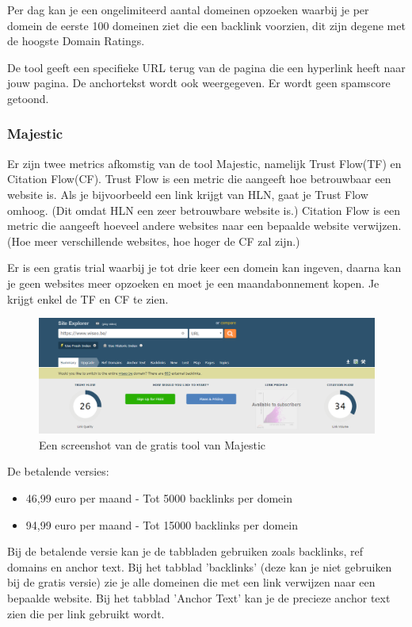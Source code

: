 Per dag kan je een ongelimiteerd aantal domeinen opzoeken waarbij je per domein de eerste 100 domeinen ziet die een backlink voorzien, dit zijn degene met de hoogste Domain Ratings.

De tool geeft een specifieke URL terug van de pagina die een hyperlink heeft naar jouw pagina. De anchortekst wordt ook weergegeven. Er wordt geen spamscore getoond. 

\subsubsection{Majestic}
\label{ch: Majestic}
Er zijn twee metrics afkomstig van de tool Majestic, namelijk Trust Flow(TF) en Citation Flow(CF). Trust Flow is een metric die aangeeft hoe betrouwbaar een website is. Als je bijvoorbeeld een link krijgt van HLN, gaat je Trust Flow omhoog. (Dit omdat HLN een zeer betrouwbare website is.) Citation Flow is een metric die aangeeft hoeveel andere websites naar een bepaalde website verwijzen. (Hoe meer verschillende websites, hoe hoger de CF zal zijn.)

Er is een gratis trial waarbij je tot drie keer een domein kan ingeven, daarna kan je geen websites meer opzoeken en moet je een maandabonnement kopen. Je krijgt enkel de TF en CF te zien.

\begin{figure}[h!]
\centering
\includegraphics[width=\linewidth]{img/majesticgratis.PNG}
\caption{Een screenshot van de gratis tool van Majestic
\autocite{majestic}}
\end{figure}

De betalende versies: 
\begin{itemize}
\item 46,99 euro per maand - Tot 5000 backlinks per domein
\item 94,99 euro per maand - Tot 15000 backlinks per domein
\end{itemize}

Bij de betalende versie kan je de tabbladen gebruiken zoals backlinks, ref domains en anchor text. Bij het tabblad 'backlinks' (deze kan je niet gebruiken bij de gratis versie) zie je alle domeinen die met een link verwijzen naar een bepaalde website. Bij het tabblad 'Anchor Text' kan je de precieze anchor text zien die per link gebruikt wordt. 

